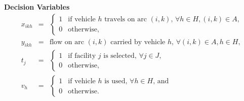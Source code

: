 {\bf Decision Variables}
\begin{eqnarray*}
x_{ikh} & = & \left\{ \begin{array}{ll}
                 1  & \mbox{if vehicle $h$ travels on arc $(i,k)$, $\forall h \in H, (i,k) \in A$,} \\
                 0  & \mbox{otherwise,}                                                  
                \end{array} 
              \right. \\
y_{ikh} & = & \mbox{flow on arc $(i,k)$ carried by vehicle $h$, $\forall (i,k) \in A, h \in H$,} \\
t_{j} & = & \left\{ \begin{array}{ll}
                 1  & \mbox{if facility $j$ is selected, $\forall j \in J$,}\\
                 0  & \mbox{otherwise,}                                                  
                \end{array}  
              \right. \\
v_h & = &\left \{ \begin{array}{ll}
                 1  & \mbox{if vehicle $h$ is used, $\forall h \in H$, and}\\
                 0  & \mbox{otherwise.}                                                  
                \end{array}  \right. 
\end{eqnarray*}

